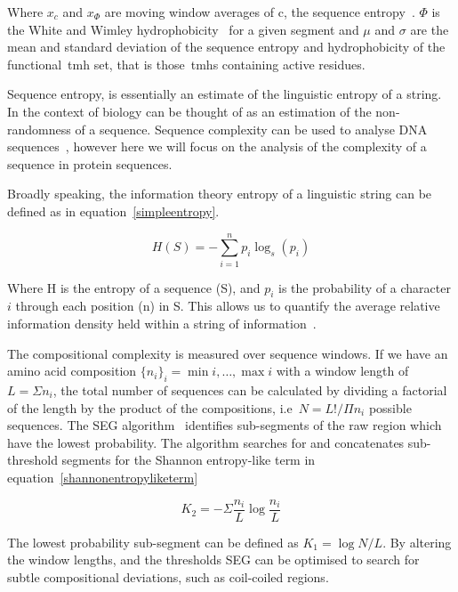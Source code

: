 Where $x_c$ and $x_\Phi$ are moving window averages of c, the sequence entropy~\cite{Wootton1996}. $\Phi$ is the White and Wimley hydrophobicity~\cite{White1999} for a given segment and $\mu$ and $\sigma$ are the mean and standard deviation of the sequence entropy and hydrophobicity of the functional~\gls{tmh} set, that is those~\gls{tmh}s containing active residues.

Sequence entropy, is essentially an estimate of the linguistic entropy of a string.
In the context of biology can be thought of as an estimation of the non-randomness of a sequence.
Sequence complexity can be used to analyse DNA sequences~\cite{Pinho2013, Oliver1993, Troyanskaya2002}, however here we will focus on the analysis of the complexity of a sequence in protein sequences.

Broadly speaking, the information theory entropy of a linguistic string can be defined as in equation~\ref{simpleentropy}.

\begin{equation} \label{simpleentropy}
	H(S)=-{\sum_{i=1}^n {p_i\log_s(p_i)}}
\end{equation}

Where H is the entropy of a sequence (S), and $p_i$ is the probability of a character $i$ through each position (n) in S. This allows us to quantify the average relative information density held within a string of information~\cite{Shannon1948}.

The compositional complexity is measured over sequence windows. If we have an amino acid composition $\{{{n}_{i}}{\}}_{i}={\min{i}},\ldots,{\max{i}}$ with a window length of $L=\Sigma {n}_i $, the total number of sequences can be calculated by dividing a factorial of the length by the product of the compositions, i.e\  $ N = L!/\Pi{n}_i $ possible sequences.
The SEG algorithm~\cite{WOOTTON1994269, Wootton1996} identifies sub-segments of the raw region which have the lowest probability.
The algorithm searches for and concatenates sub-threshold segments for the Shannon entropy-like term in equation~\ref{shannonentropyliketerm}

\begin{equation} \label{shannonentropyliketerm}
{K}_{2}=-\Sigma\frac{n_i}{L}\log\frac{n_i}{L}
\end{equation}

The lowest probability sub-segment can be defined as $ K_1=\log N/L $.
By altering the window lengths, and the thresholds SEG can be optimised to search for subtle compositional deviations, such as coil-coiled regions.


